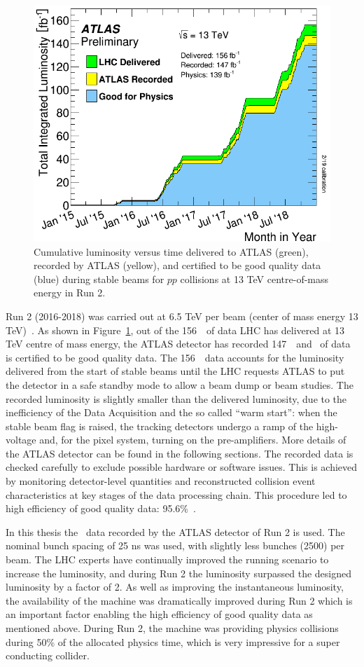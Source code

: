 \begin{figure}[bht]
	\begin{centering}	
	\includegraphics[width=.6\textwidth]{Detector/plots/Run2_lumi.png}
	\caption{Cumulative luminosity versus time delivered to 
	ATLAS (green), recorded by ATLAS (yellow), and certified to be 
	good quality data (blue) during stable beams for $pp$ collisions 
	at 13 TeV centre-of-mass energy in Run 2. 
		}
	\label{fig:Run2_lumi}
	\end{centering}
\end{figure}

Run 2 (2016-2018) was carried out
at 6.5 TeV per beam (center of mass energy 13 TeV)~\cite{LHC-Run2-Operation}. 
As shown in Figure~\ref{fig:Run2_lumi}, out of the 156~\fb\ 
of data LHC has delivered at 13 TeV centre of mass energy, the ATLAS detector has recorded 
147~\fb\ and \lumi\ of data is certified to be good quality data.
The 156~\fb\ data accounts for the luminosity delivered from the start of 
stable beams until the LHC requests ATLAS to put the detector in a 
safe standby mode to allow a beam dump or beam studies. 
The recorded luminosity is slightly smaller than the delivered luminosity, due 
to the inefficiency of the Data Acquisition and the so called ``warm start'': 
when the stable beam flag is raised, 
the tracking detectors undergo a ramp of the high-voltage and, 
for the pixel system, turning on the pre-amplifiers. 
More details of the ATLAS detector can be found in the following sections. 
The recorded data is checked carefully to exclude possible hardware or software  issues. 
This is achieved by monitoring detector-level quantities 
and reconstructed collision event characteristics at key stages of the data processing chain.
This procedure led to high efficiency of good quality data: 95.6\%~\cite{aad2020atlas}.	

In this thesis the \lumi\ data recorded by the ATLAS detector of Run 2 is used.
The nominal bunch spacing of 25 ns was used, with slightly less bunches (2500) per beam.
The LHC experts have continually improved the running scenario to increase the luminosity,
and during Run 2 the luminosity surpassed the designed luminosity by a factor of 2. 
As well as improving the instantaneous luminosity, the availability of the machine
was dramatically improved during Run 2 which is an important factor enabling the high efficiency 
of good quality data as mentioned above.
During Run 2, the machine was providing physics collisions during 50\% of 
the allocated physics time, which is very impressive for a super conducting collider. 

